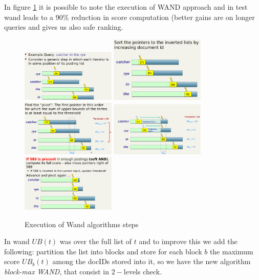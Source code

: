 In figure \ref{img:wand} it is possible to note the execution of WAND approach
and in test wand leads to a $90\%$ reduction in score computation (better
gains are on longer queries and gives us also safe ranking.

\begin{figure}
	\includegraphics[width=0.4\textwidth]{Images/wand1}
	\includegraphics[width=0.4\textwidth]{Images/wand2}
	\includegraphics[width=0.4\textwidth]{Images/wand3}
	\includegraphics[width=0.4\textwidth]{Images/wand4}
	\includegraphics[width=0.4\textwidth]{Images/wand5}
	\caption{Execution of Wand algorithms steps}
	\label{img:wand}
\end{figure}

In wand $UB(t)$ was over the full list of $t$ and to improve this we add the 
following: partition the list into blocks and store for each block $b$ the 
maximum score $UB_b(t)$ among the docIDs stored into it, so we have 
the new algorithm \emph{block-max WAND}, that consist in $2-$levels check.


